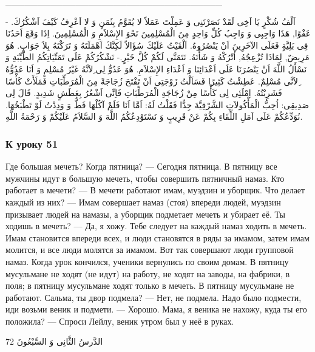 \documentclass[a5paper]{article}
\begin{document}
\_\_\_\_\_\_\_\_\_\_\_\_\_\_\_\_\_\_\_\_\_\_\_\_\_\_\_\_\_\_\_\_\_\_

اَلْفُ شُكْرٍ يَا اَخِى لَقَدْ نَصَرْتَنِى وَ عَمِلْتَ عَمَلاً لا يُقَوَّمُ بِثَمَنٍ وَ لا اَعْرِفُ كَيْفَ اَشْكُرُكَ. - عَفْوًا, هَذَا وَاجِبِى وَ وَاجِبُ كُلِّ وَاحِدٍ مِنَ الْمُسْلِمِينَ نَحْوَ الإِسْلاَمِ وَ الْمُسْلِمِينَ. اِذَا وَقَعَ اَحَدُنَا فِى بَلِيَّةٍ فَعَلَى الآخَرِينَ اَنْ يَنْصُرُوهُ. اَلْقَيْتُ عَلَيْكَ سُؤَالاً لَكِنَّكَ اَهْمَلَتَهُ وَ تَرَكْتَهُ بِلاَ جَوَابٍ. هُوَ مَرِيضٌ, لِمَاذَا تُزْعِجُهُ, اُتْرُكْهُ وَ شَأْنَهُ. نَتَمَنَّى لَكُمْ كُلَّ خَيْرٍ.- نَشْكُرُكُمْ عَلَى تَمَنِّيَاتِكُمُ الطَّيِّبَةِ وَ نَسْأَلُ اللَّهَ اَنْ يَنْصُرَنَا عَلَى اَعْدَائِنَا وَ اَعْدَاءِ الإِسْلاَمِ. هُوَ عَدُوٌّ لِى ِلاَنَّهُ غَيْرُ مُسْلِمٍ وَ اَنَا عَدُوُّهُ ِلاَنَّى مُسْلِمٌ. عَطِشْتُ كَثِيرًا فَسَاَلْتُ زَوْجَتِى اَنْ تَفْتَحَ زُجَاجَةً مِنَ الْمُرَطِّبَاتِ فَمَلَأَتْ كَأْسًا فَشَرِبْتُهُ. اِمْلَئِى لِى كَأْسًا مِنْ زُجَاجَةِ الْمُرَطِّبَاتِ فَاِنِّى اَشْعُرُ بِعَطَشٍ شَدِيدٍ. قَالَ لِى صَدِيقِى: اُحِبُّ الْمَأْكُولاَتِ الشَّرْقِيَّةَ جِدًّا فَقَلْتُ لَهُ: اَمَّا اَنَا فَلَمْ آكُلْهَا قَطُّ وَ وَدِدْتُ لَوْ تَطْبَخُهَا. نُوَدِّعُكُمْ عَلَى اَمَلِ اللِّقَاءِ بِكُمْ عَنْ قَرِيبٍ وَ نَسْتَوْدِعُكُمُ اللَّهَ وَ السَّلاَمُ عَلَيْكُمْ وَ رَحْمَةُ اللَّهِ.

\subsubsection{К уроку 51}
Где большая мечеть? Когда пятница? — Сегодня пятница. В пятницу все мужчины идут в большую мечеть, чтобы совершить пятничный намаз. Кто работает в мечети? — В мечети работают имам, муэдзин и уборщик. Что делает каждый из них? — Имам совершает намаз (стоя) впереди людей, муэдзин призывает людей на намазы, а уборщик подметает мечеть и убирает её. Ты ходишь в мечеть? — Да, я хожу. Тебе следует на каждый намаз ходить в мечеть. Имам становится впереди всех, и люди становятся в ряды за имамом, затем имам молится, и все люди молятся за имамом. Вот так совершают люди групповой намаз. Когда урок кончился, ученики вернулись по своим домам. В пятницу мусульмане не ходят (не идут) на работу, не ходят на заводы, на фабрики, в поля; в пятницу мусульмане ходят только в мечеть. В пятницу мусульмане не работают. Сальма, ты двор подме­ла? — Нет, не подмела. Надо было подмести, иди возьми веник и подмети. — Хорошо. Мама, я веника не нахожу, куда ты его положи­ла? — Спроси Лейлу, веник утром был у неё в руках.

الدَّرسُ الثَّانِى وَ السَّبْعُونَ 72
\end{document}
